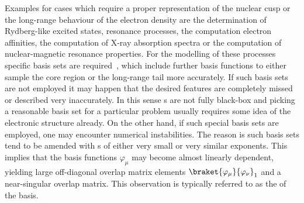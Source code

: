 Examples for cases which require
a proper representation of the nuclear cusp or
the long-range behaviour of the electron density
are the determination of Rydberg-like excited states,
resonance processes,
the computation electron affinities,
the computation of X-ray absorption spectra
or the computation of nuclear-magnetic resonance properties.
For the modelling of these processes specific basis sets
are required~\cite{Hill2013,Jensen2013},
which include further \cGTO basis functions
to either sample the core region or the long-range tail more accurately.
If such basis sets are not employed
it may happen that the desired features
are completely missed or described very inaccurately.
In this sense {\cGTO}s are not fully black-box and
picking a reasonable basis set for a particular problem
usually requires some idea of the electronic structure already.
On the other hand, if such special basis sets are employed,
one may encounter numerical instabilities.
The reason is such basis sets
tend to be amended with {\cGTO}s of either very small
or very similar exponents.
This implies that the basis functions $\varphi_\mu$ may
become almost linearly dependent,
yielding large off-diagonal
overlap matrix elements $\braket{\varphi_\mu}{\varphi_\nu}_1$
and a near-singular overlap matrix.
This observation is typically referred to as the
 of the \cGTO basis.


